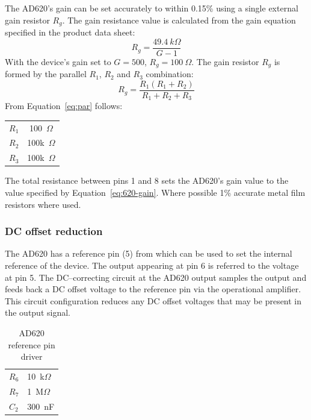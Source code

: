 The AD620's gain can be set accurately to within 0.15\% using a
single external gain resistor $R_g$. The gain resistance value is
calculated from the gain equation specified in the product data sheet:
\begin{equation}
	R_g = \frac{49.4~k\Omega}{G - 1}
	\label{eq:620-gain}
\end{equation}
With the device's gain set to $G = 500$, $R_g = 100~\Omega$. The gain
resistor $R_g$ is formed by the parallel $R_1$, $R_2$ and $R_3$
combination:
\begin{equation}
	R_g = \frac{R_1(R_1 + R_2)}{R_1 + R_2 + R_3}
	\label{eq:par}
\end{equation}
From Equation~\ref{eq:par} follows:
\begin{center}	
	\begin{tabular}[htpb]{|c|c|} \hline
	$R_1$ & 100~$\Omega$ \\
	$R_2$ & 100k~$\Omega$ \\
	$R_3$ & 100k~$\Omega$ \\
	\hline
	\end{tabular}
\end{center}	

The total resistance between pins 1 and 8 sets the AD620's gain value
to the value specified by Equation~\ref{eq:620-gain}. Where possible
1\% accurate metal film resistors where used.

\subsubsection{DC offset reduction}
The AD620 has a reference pin (5) from which can be used to set the
internal reference of the device. The output appearing at pin 6 is
referred to the voltage at pin 5. The DC--correcting circuit at the
AD620 output samples the output and feeds back a DC offset voltage to
the reference pin via the operational amplifier. This circuit
configuration reduces any DC offset voltages that may be present in
the output signal.

\begin{table}
\begin{center}	
	\begin{tabular}[htpb]{|l|l|} \hline
	$R_6$ & 10~k$\Omega$ \\
	$R_7$ & 1~M$\Omega$ \\
	$C_2$ & 300~nF \\
	\hline
	\end{tabular}
	\caption{AD620 reference pin driver}
	\label{table:dc}
\end{center}	
\end{table}

